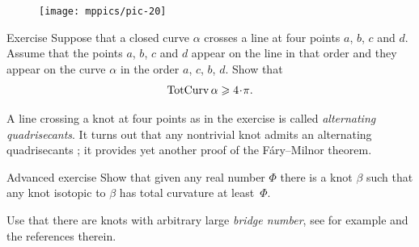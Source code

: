 \begin{figure}
\vskip-0mm
\centering
\texttt{[image: mppics/pic-20]}
\vskip0mm
\end{figure}

\begin{thm}{Exercise}
Suppose that a closed curve $\alpha$ crosses a line at four points $a$, $b$, $c$ and $d$.
Assume that the points $a$, $b$, $c$ and $d$ appear on the line in that order and they appear on the curve $\alpha$ in the order $a$, $c$, $b$, $d$.
Show that 
\[\tc\alpha\ge 4\cdot\pi.\]
\end{thm}

A line crossing a knot at four points as in the exercise is called \emph{alternating quadrisecants}.
It turns out that any nontrivial knot admits an alternating quadrisecants \cite{denne};
it provides yet another proof of the F\'ary--Milnor theorem.


\begin{thm}{Advanced exercise}
Show that given any real number $\Phi$ there is a knot $\beta$ such that any knot isotopic to $\beta$ has total curvature at least~$\Phi$.   
\end{thm}

 Use that there are knots with arbitrary large \emph{bridge number}, see for example \cite{schultens} and the references therein.

\warning
